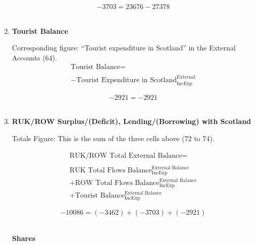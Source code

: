 \begin{enumerate}
\begin{equation} \nonumber
-3703 = 23676-27378
\end{equation}\\


\item \textbf {Tourist Balance}

Corresponding figure: ``Tourist expenditure in Scotland'' in the External Accounts (64).\\

\begin{equation}
\begin{split}
\text{Tourist Balance} =  \\ \\
-\text{Tourist Expenditure in Scotland}^\text{External}_\text{IncExp}
\end{split} \label{eq:2.5.78}
\end{equation}

\begin{equation} \nonumber
-2921 = -2921
\end{equation}\\


\item \textbf {RUK/ROW Surplus/(Deficit), Lending/(Borrowing) with Scotland}

Totals Figure: This is the sum of the three cells above (72 to 74).

\begin{equation}
\begin{split}
\text{RUK/ROW Total External Balance} =  \\ \\
\text{RUK Total Flows Balance}^\text{External Balance}_\text{IncExp}\\
+\text{ROW Total Flows Balance}^\text{External Balance}_\text{IncExp}\\
+\text{Tourist Balance}^\text{External Balance}_\text{IncExp}
\end{split} \label{eq:2.5.79}
\end{equation}

\begin{equation} \nonumber
-10086 = (-3462)+(-3703)+(-2921)
\end{equation}\\

\pagebreak

\begin{center}
\textbf{\LARGE Shares}
\end{center}


\end{enumerate}
